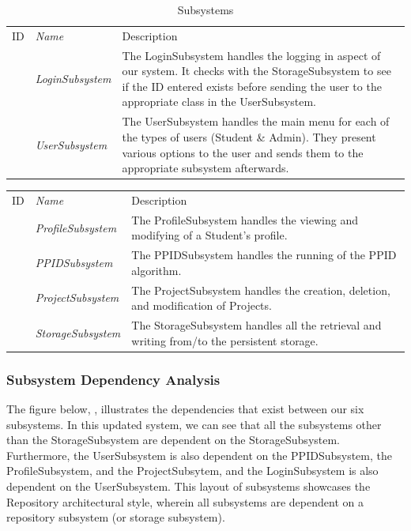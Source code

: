 \documentclass[12pt,letterpaper]{article}
\begin{document}
\begin{table}[H]
	\caption{Subsystems} 
    \begin{tabu} to 
        \tableheader{}ID & Name & Description \\
         & LoginSubsystem & The LoginSubsystem handles the logging in aspect of our system. It checks with the StorageSubsystem to see if the ID entered exists before sending the user to the appropriate class in the UserSubsystem.\\
         & UserSubsystem & The UserSubsystem handles the main menu for each of the types of users (Student \& Admin). They present various options to the user and sends them to the appropriate subsystem afterwards.\\
    \end{tabu}
\end{table}

\begin{center}
\begin{tabu} to 
        \tableheader{}ID & Name & Description \\
	 & ProfileSubsystem & The ProfileSubsystem handles the viewing and modifying of a Student's profile.\\
         & PPIDSubsystem & The PPIDSubsystem handles the running of the PPID algorithm.\\
         & ProjectSubsystem & The ProjectSubsystem handles the creation, deletion, and modification of Projects.\\
         & StorageSubsystem & The StorageSubsystem handles all the retrieval and writing from/to the persistent storage.\\
\end{tabu}
\end{center}

\subsubsection{Subsystem Dependency Analysis}

The figure below, , illustrates the dependencies that exist between our six subsystems. In this updated system, we can see that all the subsystems other than the StorageSubsystem are dependent on the StorageSubsystem. Furthermore, the UserSubsystem is also dependent on the PPIDSubsystem, the ProfileSubsystem, and the ProjectSubsytem, and the LoginSubsystem is also dependent on the UserSubsystem. This layout of subsystems showcases the Repository architectural style, wherein all subsystems are dependent on a repository subsystem (or storage subsystem). 
\end{document}
